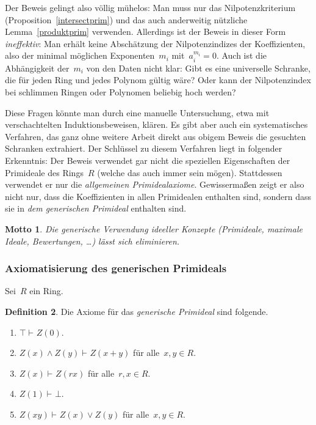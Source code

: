 \documentclass[a4paper,ngerman,12pt]{scrartcl}
\theoremstyle{definition}
\newtheorem{defn}{Definition}[section]
\theoremstyle{plain}
\newtheorem{motto}[defn]{Motto}
\theoremstyle{remark}
\newcommand{\seq}[1]{\mathrel{\vdash\!\!\!_{#1}}}
\renewcommand{\_}{\mathpunct{.}\,}
\newcommand{\?}{\,{:}\,}
\begin{document}
Der Beweis gelingt also völlig mühelos: Man muss nur
das Nilpotenzkriterium (Proposition~\ref{intersectprim}) und das auch anderweitig nützliche
Lemma~\ref{produktprim} verwenden. Allerdings ist der Beweis in dieser Form
\emph{ineffektiv}: Man erhält keine Abschätzung der Nilpotenzindizes der
Koeffizienten, also der minimal möglichen Exponenten~$m_i$ mit~$a_i^{m_i} = 0$.
Auch ist die Abhängigkeit der~$m_i$ von den Daten nicht klar: Gibt es eine
universelle Schranke, die für jeden Ring und jedes Polynom gültig wäre? Oder
kann der Nilpotenzindex bei schlimmen Ringen oder Polynomen beliebig hoch
werden?


Diese Fragen könnte man durch eine manuelle Untersuchung, etwa mit
verschachtelten Induktionsbeweisen, klären. Es gibt aber auch ein
systematisches Verfahren, das ganz ohne weitere Arbeit direkt aus obigem Beweis die
gesuchten Schranken extrahiert. Der Schlüssel zu diesem Verfahren liegt in
folgender Erkenntnis: Der Beweis verwendet gar nicht die speziellen
Eigenschaften der Primideale des Rings~$R$ (welche das auch immer sein mögen).
Stattdessen verwendet er nur die \emph{allgemeinen Primidealaxiome}. Gewissermaßen
zeigt er also nicht nur, dass die Koeffizienten in allen Primidealen enthalten
sind, sondern dass sie in \emph{dem generischen Primideal} enthalten sind.

\begin{motto}Die \emph{generische} Verwendung ideeller Konzepte (Primideale,
maximale Ideale, Bewertungen, \ldots) lässt sich eliminieren.\end{motto}


\subsubsection*{Axiomatisierung des generischen Primideals}

Sei~$R$ ein Ring.

\begin{defn}\label{defn:genprime}Die Axiome für das \emph{generische Primideal}
sind folgende.
\begin{enumerate}
\item[1.] $\top \seq{} Z(0).$
\item[2.] $Z(x) \wedge Z(y) \seq{} Z(x+y)$ für alle~$x,y \in R$.
\item[3.] $Z(x) \seq{} Z(rx)$ für alle~$r,x \in R$.
\item[4.] $Z(1) \seq{} \bot.$
\item[5.] $Z(xy) \seq{} Z(x) \vee Z(y)$ für alle~$x,y \in R$.
\end{enumerate}
\end{defn}
\end{document}
